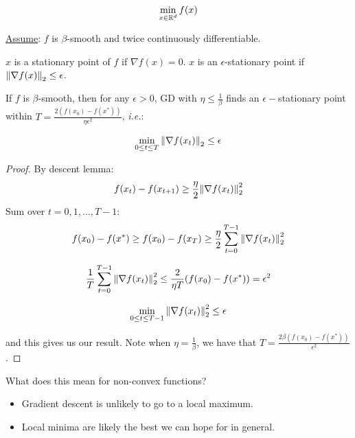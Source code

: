\[
    \min_{x \in \mathbb{R}^d} f(x)
\]

\underline{Assume}: \(f\) is \(\beta\)-smooth and twice continuously differentiable. 

\begin{definition}
    \(x\) is a stationary point of \(f\) if \(\nabla f(x) = 0\). \(x\) is an 
    \(\epsilon\)-stationary point if \(\norm{\nabla f(x)}_2 \leq \epsilon\). 
\end{definition}


\begin{theorem}
    If \(f\) is \(\beta\)-smooth, then for any \(\epsilon > 0\), 
    GD with \(\eta \leq \frac{1}{\beta}\) finds an \(\epsilon-\)stationary point 
    within \(T = \frac{2 \left( f(x_0) - f(x^*)\right)}{\eta \epsilon^2}\), \emph{i.e.}: 

    \begin{align*}
        \min_{0 \leq t \leq T} \norm{\nabla f(x_t)}_2 \leq \epsilon
    \end{align*}
\end{theorem}

\begin{proof}
    By descent lemma: 
    \begin{align*}
        f(x_t) - f(x_{t+1}) \geq \frac{\eta}{2} \norm{\nabla f(x_t)}^2_2
    \end{align*}
    Sum over \(t = 0, 1, \ldots, T-1\): 
    \[
        f(x_0) - f(x^*) \geq f(x_0) - f(x_T) \geq \frac{\eta}{2} \sum_{t=0}^{T-1} \norm{\nabla f(x_t)}^2_2
    \]

    \[
        \frac{1}{T} \sum_{t=0}^{T-1}\norm{\nabla f(x_t)}^2_2 \leq \frac{2}{\eta T}(f(x_0)-f(x^*)) = \epsilon^2
    \]

    \[
        \min_{0 \leq t \leq T-1} \norm{\nabla f(x_t)}^2_2 \leq \epsilon
    \]

    and this gives us our result. Note when \(\eta = \frac{1}{\beta}\), we have that \(T = \frac{2 \beta (f(x_0) - f(x^*))}{\epsilon^2}\).
\end{proof}

\begin{remark}
    What does this mean for non-convex functions? 

\begin{itemize}
    \item Gradient descent is unlikely to go to a local maximum.
    \item Local minima are likely the best we can hope for in general.
\end{itemize}

\end{remark}


